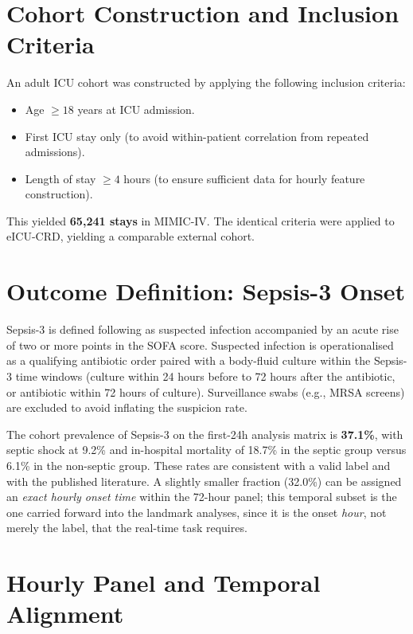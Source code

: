 \section{Cohort Construction and Inclusion Criteria}
An adult ICU cohort was constructed by applying the following inclusion
criteria:
\begin{itemize}
  \item Age $\ge 18$ years at ICU admission.
  \item First ICU stay only (to avoid within-patient correlation from repeated
  admissions).
  \item Length of stay $\ge 4$ hours (to ensure sufficient data for hourly
  feature construction).
\end{itemize}

This yielded \textbf{65{,}241 stays} in MIMIC-IV. The identical criteria were
applied to eICU-CRD, yielding a comparable external cohort.

\section{Outcome Definition: Sepsis-3 Onset}
\label{sec:outcome}

Sepsis-3 is defined following \textcite{seymour2016criteria}
as suspected infection accompanied by an acute rise of two or more points in
the SOFA score. Suspected infection is operationalised as a qualifying
antibiotic order paired with a body-fluid culture within the Sepsis-3 time
windows (culture within 24 hours before to 72 hours after the antibiotic, or
antibiotic within 72 hours of culture). Surveillance swabs (e.g., MRSA screens)
are excluded to avoid inflating the suspicion rate.

The cohort prevalence of Sepsis-3 on the first-24h analysis matrix is
\textbf{37.1\%}, with septic shock at 9.2\% and in-hospital mortality of 18.7\%
in the septic group versus 6.1\% in the non-septic group. These rates are
consistent with a valid label and with the published literature. A slightly
smaller fraction (32.0\%) can be assigned an \emph{exact hourly onset time}
within the 72-hour panel; this temporal subset is the one carried forward into
the landmark analyses, since it is the onset \emph{hour}, not merely the label,
that the real-time task requires.

\section{Hourly Panel and Temporal Alignment}
\label{sec:panel}

